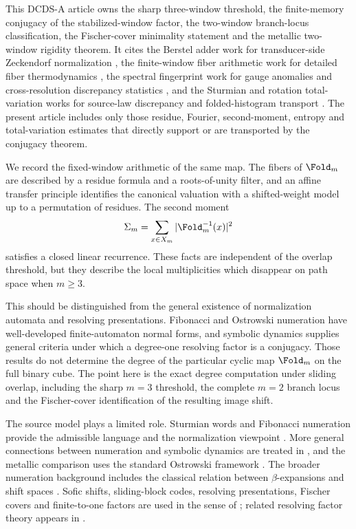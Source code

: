 This DCDS-A article owns the sharp three-window threshold, the finite-memory conjugacy of the stabilized-window factor, the two-window branch-locus classification, the Fischer-cover minimality statement and the metallic two-window rigidity theorem. It cites the Berstel adder work for transducer-side Zeckendorf normalization \cite{MaZhang2026BerstelAdder}, the finite-window fiber arithmetic work for detailed fiber thermodynamics \cite{MaZhang2026FiberThermo}, the spectral fingerprint work for gauge anomalies and cross-resolution discrepancy statistics \cite{MaZhang2026GaugeAnomaly}, and the Sturmian and rotation total-variation works for source-law discrepancy and folded-histogram transport \cite{MaZhang2026SturmianRigidity,MaZhang2026FoldedRotation}. The present article includes only those residue, Fourier, second-moment, entropy and total-variation estimates that directly support or are transported by the conjugacy theorem.

We record the fixed-window arithmetic of the same map. The fibers of $\Fold_m$ are described by a residue formula and a roots-of-unity filter, and an affine transfer principle identifies the canonical valuation with a shifted-weight model up to a permutation of residues. The second moment
\[
\Sigma_m=\sum_{x\in X_m}|\Fold_m^{-1}(x)|^2
\]
satisfies a closed linear recurrence. These facts are independent of the overlap threshold, but they describe the local multiplicities which disappear on path space when $m\ge3$.

This should be distinguished from the general existence of normalization automata and resolving presentations. Fibonacci and Ostrowski numeration have well-developed finite-automaton normal forms, and symbolic dynamics supplies general criteria under which a degree-one resolving factor is a conjugacy. Those results do not determine the degree of the particular cyclic map $\Fold_m$ on the full binary cube. The point here is the exact degree computation under sliding overlap, including the sharp $m=3$ threshold, the complete $m=2$ branch locus and the Fischer-cover identification of the resulting image shift.

The source model plays a limited role. Sturmian words and Fibonacci numeration provide the admissible language and the normalization viewpoint \cite{MorseHedlund1940,Lothaire2002,Queffelec2010,Frougny1992,Berstel2001}. More general connections between numeration and symbolic dynamics are treated in \cite{BertheRigo2010,BertheSteinerThuswaldner2019}, and the metallic comparison uses the standard Ostrowski framework \cite{Ostrowski1922,Berthe2001Ostrowski,AlloucheShallit2003}. The broader numeration background includes the classical relation between $\beta$-expansions and shift spaces \cite{Parry1960}. Sofic shifts, sliding-block codes, resolving presentations, Fischer covers and finite-to-one factors are used in the sense of \cite{Hedlund1969,LindMarcus1995,Kitchens1998,Nasu1995}; related resolving factor theory appears in \cite{Ashley1991,Boyle1983}.

